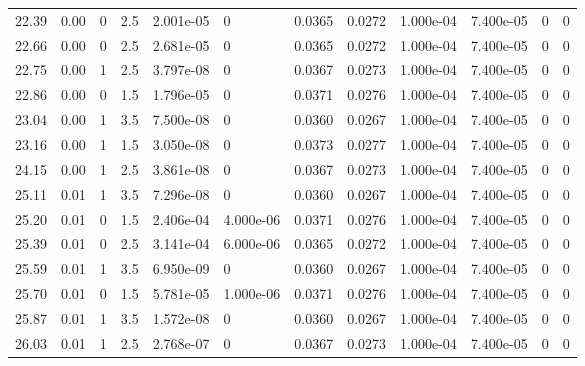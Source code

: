 \documentclass[preview]{standalone}
\begin{document}
{{{\begin{tabular}{L{1.2cm}C{1.2cm} C{0.3cm}C{0.5cm} C{1.4cm}C{1.4cm} C{1.4cm}C{1.4cm} C{1.6cm}C{1.6cm} C{1.6cm}C{1.6cm}}
  22.39  &  0.00  & 0     & 2.5 &  2.001e-05  & 0  &  0.0365&   0.0272& 1.000e-04 & 7.400e-05   &  0 & 0  \\ 
  22.66  &  0.00  & 0     & 2.5 &  2.681e-05  & 0  &  0.0365&   0.0272& 1.000e-04 & 7.400e-05   &  0 & 0  \\ 
  22.75  &  0.00  & 1     & 2.5 &  3.797e-08  & 0  &  0.0367&   0.0273& 1.000e-04 & 7.400e-05   &  0 & 0  \\ 
  22.86  &  0.00  & 0     & 1.5 &  1.796e-05  & 0  &  0.0371&   0.0276& 1.000e-04 & 7.400e-05   &  0 & 0  \\ 
  23.04  &  0.00  & 1     & 3.5 &  7.500e-08  & 0  &  0.0360&   0.0267& 1.000e-04 & 7.400e-05   &  0 & 0  \\ 
  23.16  &  0.00  & 1     & 1.5 &  3.050e-08  & 0  &  0.0373&   0.0277& 1.000e-04 & 7.400e-05   &  0 & 0  \\ 
  24.15  &  0.00  & 1     & 2.5 &  3.861e-08  & 0  &  0.0367&   0.0273& 1.000e-04 & 7.400e-05   &  0 & 0  \\ 
  25.11  &  0.01  & 1     & 3.5 &  7.296e-08  & 0  &  0.0360&   0.0267& 1.000e-04 & 7.400e-05   &  0 & 0  \\ 
  25.20  &  0.01  & 0     & 1.5 &  2.406e-04  & 4.000e-06  &  0.0371&   0.0276& 1.000e-04 & 7.400e-05   &  0 & 0  \\ 
  25.39  &  0.01  & 0     & 2.5 &  3.141e-04  & 6.000e-06  &  0.0365&   0.0272& 1.000e-04 & 7.400e-05   &  0 & 0  \\ 
  25.59  &  0.01  & 1     & 3.5 &  6.950e-09  & 0  &  0.0360&   0.0267& 1.000e-04 & 7.400e-05   &  0 & 0  \\ 
  25.70  &  0.01  & 0     & 1.5 &  5.781e-05  & 1.000e-06  &  0.0371&   0.0276& 1.000e-04 & 7.400e-05   &  0 & 0  \\ 
  25.87  &  0.01  & 1     & 3.5 &  1.572e-08  & 0  &  0.0360&   0.0267& 1.000e-04 & 7.400e-05   &  0 & 0  \\ 
  26.03  &  0.01  & 1     & 2.5 &  2.768e-07  & 0  &  0.0367&   0.0273& 1.000e-04 & 7.400e-05   &  0 & 0  \\ 
\hline 
\end{tabular} 

}}}
\end{document}
